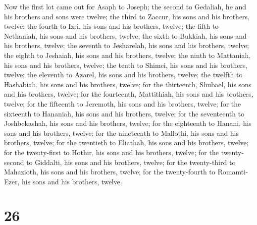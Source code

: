  Now the first lot came out for Asaph to Joseph; the second
to Gedaliah, he and his brothers and sons were twelve;  the
third to Zaccur, his sons and his brothers, twelve;  the
fourth to Izri, his sons and his brothers, twelve;  the
fifth to Nethaniah, his sons and his brothers, twelve;  the
sixth to Bukkiah, his sons and his brothers, twelve;  the
seventh to Jesharelah, his sons and his brothers, twelve; 
the eighth to Jeshaiah, his sons and his brothers, twelve; 
the ninth to Mattaniah, his sons and his brothers, twelve; 
the tenth to Shimei, his sons and his brothers, twelve; 
the eleventh to Azarel, his sons and his brothers, twelve; 
the twelfth to Hashabiah, his sons and his brothers, twelve;
 for the thirteenth, Shubael, his sons and his brothers,
twelve;  for the fourteenth, Mattithiah, his sons and his
brothers, twelve;  for the fifteenth to Jeremoth, his sons
and his brothers, twelve;  for the sixteenth to Hananiah,
his sons and his brothers, twelve;  for the seventeenth to
Joshbekashah, his sons and his brothers, twelve;  for the
eighteenth to Hanani, his sons and his brothers, twelve; 
for the nineteenth to Mallothi, his sons and his brothers, twelve;
 for the twentieth to Eliathah, his sons and his brothers,
twelve;  for the twenty-first to Hothir, his sons and his
brothers, twelve;  for the twenty-second to Giddalti, his
sons and his brothers, twelve;  for the twenty-third to
Mahazioth, his sons and his brothers, twelve;  for the
twenty-fourth to Romamti-Ezer, his sons and his brothers, twelve.

\hypertarget{section-25}{%
\section{26}\label{section-25}}

